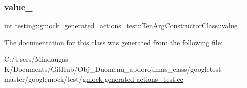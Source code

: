 \subsubsection{\texorpdfstring{value\_}{value\_}}
{\footnotesize\ttfamily int testing\+::gmock\+\_\+generated\+\_\+actions\+\_\+test\+::\+Ten\+Arg\+Constructor\+Class\+::value\+\_\+}



The documentation for this class was generated from the following file\+:\begin{DoxyCompactItemize}
\item 
C\+:/\+Users/\+Mindaugas K/\+Documents/\+Git\+Hub/\+Obj\+\_\+\+Duomenu\+\_\+apdorojimas\+\_\+class/googletest-\/master/googlemock/test/\mbox{\hyperlink{googletest-master_2googlemock_2test_2gmock-generated-actions__test_8cc}{gmock-\/generated-\/actions\+\_\+test.\+cc}}\end{DoxyCompactItemize}

